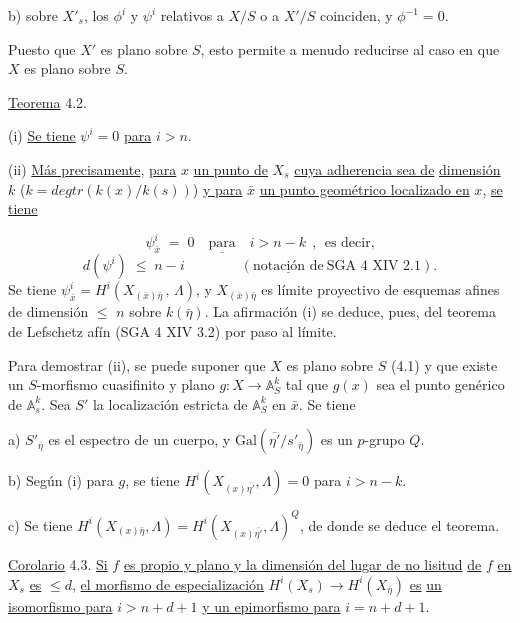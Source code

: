 
b) sobre $X'_s$, los $\phi^i$ y $\psi^i$ relativos a $X/S$ o a $X'/S$ coinciden, y $\phi^{-1} = 0$.

Puesto que $X'$ es plano sobre $S$, esto permite a menudo reducirse al caso en que $X$ es plano sobre $S$.

\underline{Teorema} 4.2.

(i) \underline{Se tiene} $\psi^i = 0$ \underline{para} $i > n$.

(ii) \underline{Más precisamente}, \underline{para} $x$ \underline{un punto de} $X_s$ \underline{cuya adherencia sea de} \underline{dimensión} $k$ ($k = deg tr(k(x)/k(s))$) \underline{y para} $\bar{x}$ \underline{un punto geométrico localizado en} $x$, \underline{se tiene}

\begin{equation*}
\psi^i_{\bar{x}} \;=\; 0 \quad \underline{\text{para}} \quad i > n-k \;\, , \;\, \text{es decir,}
\end{equation*}
\begin{equation*}
d(\psi^i) \;\leqslant\; n-i \qquad\qquad (\underline{\text{notación de}}\ \text{SGA 4 XIV 2.1}).
\end{equation*}
Se tiene $\psi^i_{\bar{x}} = H^i(X_{(\bar{x})\bar\eta}\, ,\, \Lambda)$, y $X_{(\bar{x})\bar\eta}$ es límite proyectivo de esquemas afines de dimensión $\leqslant$ $n$ sobre $k(\bar\eta)$. La afirmación (i) se deduce, pues, del teorema de Lefschetz afín (SGA 4 XIV 3.2) por paso al límite.

Para demostrar (ii), se puede suponer que $X$ es plano sobre $S$ (4.1) y que existe un $S$-morfismo cuasifinito y plano $g : X \longrightarrow \mathbb{A}^k_S$ tal que $g(x)$ sea el punto genérico de $\mathbb{A}^k_s$. Sea $S'$ la localización estricta de $\mathbb{A}^k_S$ en $\bar{x}$. Se tiene

a) $S'_{\bar\eta}$ es el espectro de un cuerpo, y $\mathrm{Gal}(\overline{\eta'}/s'_{\bar\eta})$ es un $p$-grupo $Q$.

b) Según (i) para $g$, se tiene $H^i(X_{(x)\overline{\eta'}},\Lambda) = 0$ para $i > n-k$.

c) Se tiene $H^i(X_{(x)\bar\eta},\Lambda) = H^i(X_{(x)\overline{\eta'}},\Lambda)^Q$, de donde se deduce el teorema.

\underline{Corolario} 4.3.  \underline{Si} $f$ \underline{es propio y plano y la dimensión del lugar de no lisitud} \underline{de} $f$ \underline{en} $X_s$ \underline{es} $\leqslant d$, \underline{el morfismo de especialización} $H^i(X_s) \longrightarrow H^i(X_{\bar\eta})$ \underline{es} \underline{un isomorfismo para} $i > n+d+1$ \underline{y un epimorfismo para} $i = n+d+1$.

